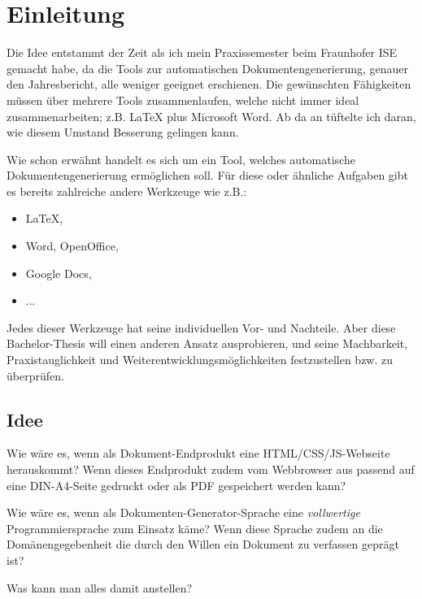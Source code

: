 \chapter{Einleitung}

Die Idee entstammt der Zeit als ich mein Praxissemester beim Fraunhofer ISE
gemacht habe, da die Tools zur automatischen Dokumentengenerierung, genauer
den Jahresbericht, alle weniger geeignet erschienen. Die gewünschten
Fähigkeiten müssen über mehrere Tools zusammenlaufen, welche nicht immer
ideal zusammenarbeiten; z.B. LaTeX plus Microsoft Word. Ab da an tüftelte
ich daran, wie diesem Umstand Besserung gelingen kann.

Wie schon erwähnt handelt es sich um ein Tool, welches automatische
Dokumentengenerierung ermöglichen soll. Für diese oder ähnliche Aufgaben
gibt es bereits zahlreiche andere Werkzeuge wie z.B.:

\begin{itemize}
  \item LaTeX,
  \item Word, OpenOffice,
  \item Google Docs,
  \item ...
\end{itemize}

Jedes dieser Werkzeuge hat seine individuellen Vor- und Nachteile.
Aber diese Bachelor-Thesis will einen anderen Ansatz ausprobieren, und
seine Machbarkeit, Praxistauglichkeit und Weiterentwicklungsmöglichkeiten
festzustellen bzw. zu überprüfen.
\cite{ref}

\section{Idee}

Wie wäre es, wenn als Dokument-Endprodukt eine HTML/CSS/JS-Webseite
herauskommt? Wenn dieses Endprodukt zudem vom Webbrowser aus passend auf
eine DIN-A4-Seite gedruckt oder als PDF gespeichert werden kann?

Wie wäre es, wenn als Dokumenten-\-Generator-\-Sprache eine \emph{vollwertige}
Programmiersprache zum Einsatz käme? Wenn diese Sprache zudem an die
Domänen\-gege\-ben\-heit die durch den Willen ein Dokument zu verfassen geprägt ist?

Was kann man alles damit anstellen?

